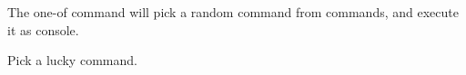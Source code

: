 \label{ch:one_of}

The one-of command will pick a random command from commands, and execute it as console.


\begin{example}{Pick a lucky command.}
\end{example}
